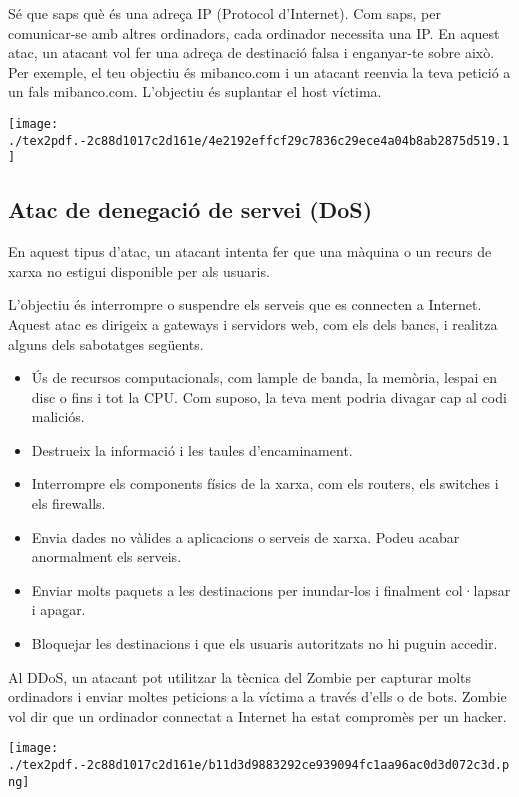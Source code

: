 \documentclass[]{article}
\begin{document}
Sé que saps què és una adreça IP (Protocol d'Internet). Com saps, per
comunicar-se amb altres ordinadors, cada ordinador necessita una IP. En
aquest atac, un atacant vol fer una adreça de destinació falsa i
enganyar-te sobre això. Per exemple, el teu objectiu és mibanco.com i un
atacant reenvia la teva petició a un fals mibanco.com. L'objectiu és
suplantar el host víctima.

\texttt{[image: ./tex2pdf.-2c88d1017c2d161e/4e2192effcf29c7836c29ece4a04b8ab2875d519.1]}

\hypertarget{atac-de-denegaciuxf3-de-servei-dos}{%
\subsection{Atac de denegació de servei
(DoS)}\label{atac-de-denegaciuxf3-de-servei-dos}}

En aquest tipus d'atac, un atacant intenta fer que una màquina o un
recurs de xarxa no estigui disponible per als usuaris.

L'objectiu és interrompre o suspendre els serveis que es connecten a
Internet. Aquest atac es dirigeix ​​a gateways i servidors web, com els
dels bancs, i realitza alguns dels sabotatges següents.

\begin{itemize}
\item
  Ús de recursos computacionals, com lample de banda, la memòria, lespai
  en disc o fins i tot la CPU. Com suposo, la teva ment podria divagar
  cap al codi maliciós.
\item
  Destrueix la informació i les taules d'encaminament.
\item
  Interrompre els components físics de la xarxa, com els routers, els
  switches i els firewalls.
\item
  Envia dades no vàlides a aplicacions o serveis de xarxa. Podeu acabar
  anormalment els serveis.
\item
  Enviar molts paquets a les destinacions per inundar-los i finalment
  col·lapsar i apagar.
\item
  Bloquejar les destinacions i que els usuaris autoritzats no hi puguin
  accedir.
\end{itemize}

Al DDoS, un atacant pot utilitzar la tècnica del Zombie per capturar
molts ordinadors i enviar moltes peticions a la víctima a través d'ells
o de bots. Zombie vol dir que un ordinador connectat a Internet ha estat
compromès per un hacker.

\texttt{[image: ./tex2pdf.-2c88d1017c2d161e/b11d3d9883292ce939094fc1aa96ac0d3d072c3d.png]}
\end{document}
